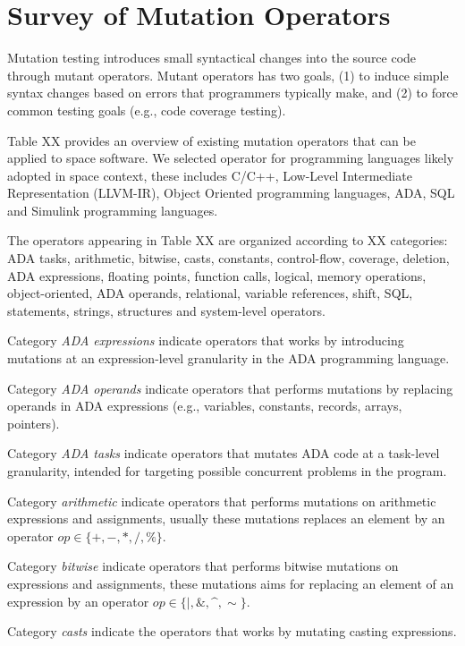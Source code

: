 
\section{Survey of Mutation Operators}
\label{sec:operators}

Mutation testing introduces small syntactical changes into the source code through mutant operators.
Mutant operators has two goals, (1) to induce simple syntax changes based on errors that programmers typically make, and (2) to force common testing goals (e.g., code coverage testing).

Table XX provides an overview of existing mutation operators that can be applied to space software.
We selected operator for programming languages likely adopted in space context, these includes C/C++, Low-Level Intermediate Representation (LLVM-IR), Object Oriented programming languages, ADA, SQL and Simulink programming languages.

The operators appearing in Table XX are organized according to XX categories: ADA tasks, arithmetic, bitwise, casts, constants, control-flow, coverage, deletion, ADA expressions, floating points, function calls, logical, memory operations, object-oriented, ADA operands, relational, variable references, shift, SQL, statements, strings, structures and system-level operators.

Category \emph{ADA expressions} indicate operators that works by introducing mutations at an expression-level granularity in the ADA programming language. 

Category \emph{ADA operands} indicate operators that performs mutations by replacing operands in ADA expressions (e.g., variables, constants, records, arrays, pointers).

Category \emph{ADA tasks} indicate operators that mutates ADA code at a task-level granularity, intended for targeting possible concurrent problems in the program.

Category \emph{arithmetic} indicate operators that performs mutations on arithmetic expressions and assignments, usually these mutations replaces an element by an operator $op \in \{+, -, *, /, \%\}$. 

Category \emph{bitwise} indicate operators that performs bitwise mutations on expressions and assignments, these mutations aims for replacing an element of an expression by an operator $op \in \{\mid, \&, \^{}, \sim\}$. 

Category \emph{casts} indicate the operators that works by mutating casting expressions.

